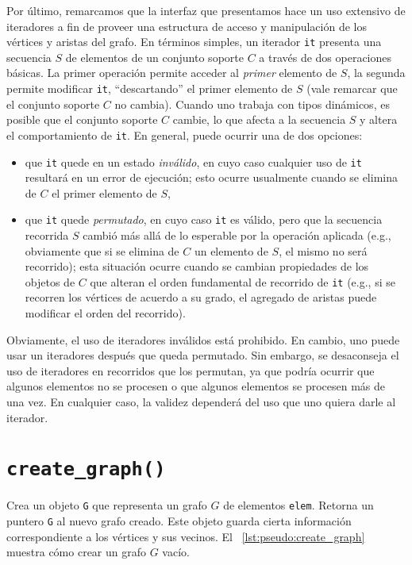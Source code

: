 \documentclass[%
    a4paper,%
    fontsize=12pt,%
    DIV=12,
    twoside,%
    openright,%
    titlepage=true,%
    headsepline,%
    toc=bibliography,%
    parskip=half,%
    cleardoublepage=empty,%
    headings=big,%
]{scrbook}
\makeatletter
\newcommand{\Code}[2][]{\lstinline[basicstyle={\ttfamily},#1]@#2@}
\makeatother
\begin{document}
Por último, remarcamos que la interfaz que presentamos hace un uso extensivo de iteradores a fin de proveer una estructura de acceso y manipulación de los vértices y aristas del grafo.  En términos simples, un iterador \Code{it} presenta una secuencia $S$ de elementos de un conjunto soporte $C$ a través de dos operaciones básicas.  La primer operación permite acceder al \emph{primer} elemento de $S$, la segunda permite modificar \Code{it}, ``descartando'' el primer elemento de $S$ (vale remarcar que el conjunto soporte $C$ no cambia).  Cuando uno trabaja con tipos dinámicos, es posible que el conjunto  soporte $C$ cambie, lo que afecta a la secuencia $S$ y altera el comportamiento de \Code{it}.  En general, puede ocurrir una de dos opciones:
\begin{itemize}
  \item que \Code{it} quede en un estado \emph{inválido}, en cuyo caso cualquier uso de \Code{it} resultará en un error de ejecución; esto ocurre usualmente cuando se elimina de $C$ el primer elemento de $S$,
  \item que \Code{it} quede \emph{permutado}, en cuyo caso \Code{it} es válido, pero que la secuencia recorrida $S$ cambió más allá de lo esperable por la operación aplicada (e.g., obviamente que si se elimina de $C$ un elemento de $S$, el mismo no será recorrido); esta situación ocurre cuando se cambian propiedades de los objetos de $C$ que alteran el orden fundamental de recorrido de \Code{it} (e.g., si se recorren los vértices de acuerdo a su grado, el agregado de aristas puede modificar el orden del recorrido).  
\end{itemize}
Obviamente, el uso de iteradores inválidos está prohibido.  En cambio, uno puede usar un iteradores después que queda permutado.  Sin embargo, se desaconseja el uso de iteradores en recorridos que los permutan, ya que podría ocurrir que algunos elementos no se procesen o que algunos elementos se procesen más de una vez.  En cualquier caso, la validez dependerá del uso que uno quiera darle al iterador.

\section{\texorpdfstring{\Code{create_graph()}}{create\_graph()}}
\label{sec:tad grafo:create-graph}

Crea un objeto \Code{G} que representa un grafo $G$ de elementos \Code{elem}. Retorna un puntero \Code{G} al nuevo grafo creado. Este objeto guarda cierta información correspondiente a los vértices y sus vecinos. El \lstlistingname~\ref{lst:pseudo:create_graph} muestra cómo crear un grafo $G$ vacío.
\end{document}
